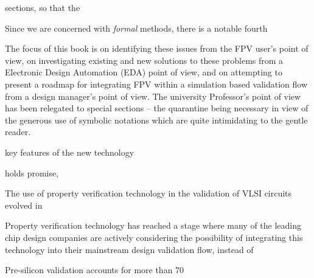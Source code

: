 sections, so that the  


Since we are concerned with {\em formal} methods, there is a notable fourth

The focus of this book
is on identifying these issues from the FPV user's point of view, on 
investigating existing and new solutions to these problems from a Electronic
Design Automation (EDA) point of view, and on attempting to present a
roadmap for integrating FPV within a simulation based validation flow from
a design manager's point of view. The university Professor's point of view 
has been relegated to special sections -- the quarantine being necessary
in view of the generous use of symbolic notations which are quite 
intimidating to the gentle reader.





key features of the new technology


holds promise, 

The use of property verification technology in the validation of VLSI circuits
evolved in 
 
Property verification technology has reached a stage where many of the leading
chip design companies are actively considering the possibility of integrating
this technology into their mainstream design validation flow, instead of 

 Pre-silicon validation accounts for more than 70%
